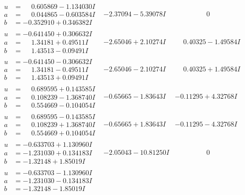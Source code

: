\documentclass[1p]{elsarticle_modified}
\theoremstyle{definition}
\begin{document}
$$\begin{array}{c|c|c}
\begin{aligned}
u &= \phantom{-}0.605869 - 1.134030 I \\
a &= \phantom{-}0.044865 - 0.603584 I \\
b &= -0.352910 + 0.346382 I\end{aligned}
 & -2.37094 - 5.39078 I & \phantom{-0.000000 } 0 \\ \hline\begin{aligned}
u &= -0.641450 + 0.306632 I \\
a &= \phantom{-}1.34181 + 0.49511 I \\
b &= \phantom{-}1.43513 - 0.09491 I\end{aligned}
 & -2.65046 + 2.10274 I & \phantom{-}0.40325 - 1.49584 I \\ \hline\begin{aligned}
u &= -0.641450 - 0.306632 I \\
a &= \phantom{-}1.34181 - 0.49511 I \\
b &= \phantom{-}1.43513 + 0.09491 I\end{aligned}
 & -2.65046 - 2.10274 I & \phantom{-}0.40325 + 1.49584 I \\ \hline\begin{aligned}
u &= \phantom{-}0.689595 + 0.143585 I \\
a &= \phantom{-}0.108239 - 1.368740 I \\
b &= \phantom{-}0.554669 - 0.104054 I\end{aligned}
 & -0.65665 - 1.83643 I & -0.11295 + 4.32768 I \\ \hline\begin{aligned}
u &= \phantom{-}0.689595 - 0.143585 I \\
a &= \phantom{-}0.108239 + 1.368740 I \\
b &= \phantom{-}0.554669 + 0.104054 I\end{aligned}
 & -0.65665 + 1.83643 I & -0.11295 - 4.32768 I \\ \hline\begin{aligned}
u &= -0.633703 + 1.130960 I \\
a &= -1.231030 + 0.134183 I \\
b &= -1.32148 + 1.85019 I\end{aligned}
 & -2.05043 - 10.81250 I & \phantom{-0.000000 } 0 \\ \hline\begin{aligned}
u &= -0.633703 - 1.130960 I \\
a &= -1.231030 - 0.134183 I \\
b &= -1.32148 - 1.85019 I\end{aligned}

\end{array}$$
\end{document}
